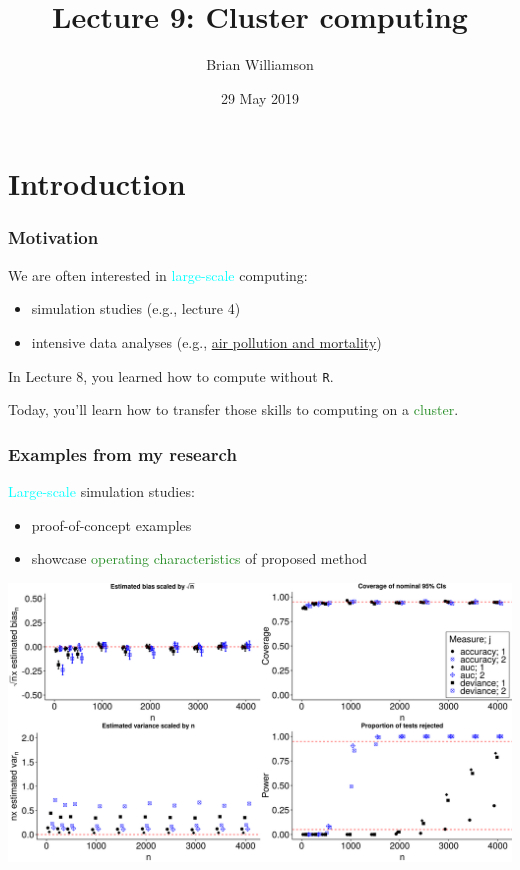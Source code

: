 \documentclass[12pt, 
hyperref={colorlinks=true, linkcolor=BlueViolet, urlcolor=BlueViolet},dvipsnames]{beamer}
\title{Lecture 9: Cluster computing}
\author{Brian Williamson}
\institute{BIOST 561: Computational Skills For Biostatistics I}
\date{29 May 2019}
\begin{document}
\begin{frame}
\titlepage
\end{frame}

\section{Introduction}
\begin{frame}
\frametitle{Motivation}
We are often interested in \textcolor{cyan}{large-scale} computing: \vspace{-0.3cm} \pause
\begin{itemize}
\item simulation studies (e.g., lecture 4) \pause
\item intensive data analyses (e.g., \href{https://www.nejm.org/doi/full/10.1056/nejmoa1702747}{air pollution and mortality}) \pause
\end{itemize}

In Lecture 8, you learned how to compute without \texttt{R}. 

Today, you'll learn how to transfer those skills to computing on a \textcolor{ForestGreen}{cluster}.

\end{frame}

\begin{frame}
\frametitle{Examples from my research}
\textcolor{cyan}{Large-scale} simulation studies: \vspace{-0.3cm} \pause
\begin{itemize}
\item proof-of-concept examples \pause
\item showcase \textcolor{ForestGreen}{operating characteristics} of proposed method
\end{itemize} \pause

\begin{center}
\includegraphics[width = 1\textwidth]{plots/bivariate_loss_performance_deviance_accuracy_auc.png}
\end{center}
\end{frame}
\end{document}
